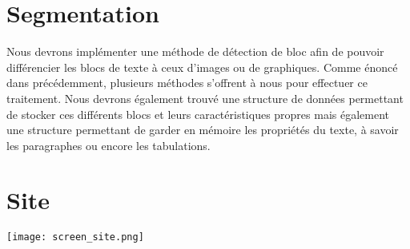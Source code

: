 \documentclass[]{report}
\begin{document}

    \section{Segmentation} %
    \label{sec:s\'egmentation}
  		Nous devrons implémenter une méthode de détection de bloc afin de pouvoir différencier les blocs de texte à ceux d'images ou de graphiques. Comme énoncé dans précédemment, plusieurs méthodes s'offrent à nous pour effectuer ce traitement. Nous devrons également trouvé une structure de données permettant de stocker ces différents blocs et leurs caractéristiques propres mais également une structure permettant de garder en mémoire les propriétés du texte, à savoir les paragraphes ou encore les tabulations.




\appendix

\section{Site} %
\label{sec:site}
	\texttt{[image: screen\_site.png]}
  



\end{document}

